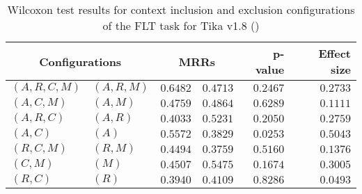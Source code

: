 
\begin{table}
\begin{spacing}{1.2}
\centering
\caption{Wilcoxon test results for context inclusion and exclusion configurations of the FLT task for Tika v1.8 (\ctwo)}
\label{table:versus-wilcox-tika-flt-context}
\begin{tabular}{ll|rr|rr}
\toprule
      \multicolumn{2}{c|}{Configurations} &                \multicolumn{2}{c|}{MRRs} &             p-value & Effect size \\
\midrule
 $(A,R,C,M)$ &  $(A,R,M)$ &  $\bm{0.6482}$ &       $0.4713$ & $0.2467$ &    $0.2733$ \\
   $(A,C,M)$ &    $(A,M)$ &       $0.4759$ &  $\bm{0.4864}$ & $0.6289$ &    $0.1111$ \\
   $(A,R,C)$ &    $(A,R)$ &       $0.4033$ &  $\bm{0.5231}$ & $0.2050$ &    $0.2759$ \\
     $(A,C)$ &      $(A)$ &  $\bm{0.5572}$ &       $0.3829$ & $0.0253$ &    $0.5043$ \\
   $(R,C,M)$ &    $(R,M)$ &  $\bm{0.4494}$ &       $0.3759$ & $0.5160$ &    $0.1376$ \\
     $(C,M)$ &      $(M)$ &       $0.4507$ &  $\bm{0.5475}$ & $0.1674$ &    $0.3005$ \\
     $(R,C)$ &      $(R)$ &       $0.3940$ &  $\bm{0.4109}$ & $0.8286$ &    $0.0493$ \\
\bottomrule
\end{tabular}

\end{spacing}
\end{table}


